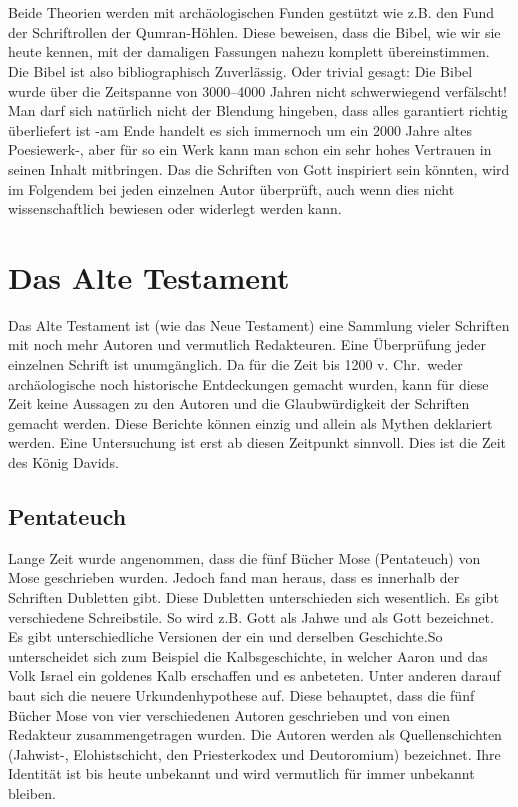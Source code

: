 \\~\\
Beide Theorien werden mit archäologischen Funden gestützt wie z.B. den Fund der Schriftrollen der Qumran-Höhlen. Diese beweisen, dass die Bibel, wie wir sie heute kennen, mit der damaligen Fassungen nahezu komplett übereinstimmen. Die Bibel ist also bibliographisch Zuverlässig. Oder trivial gesagt: Die Bibel wurde über die Zeitspanne von 3000--4000 Jahren nicht schwerwiegend verfälscht! Man darf sich natürlich nicht der Blendung hingeben, dass alles garantiert richtig überliefert ist -am Ende handelt es sich immernoch um ein 2000 Jahre altes Poesiewerk-, aber für so ein Werk kann man schon ein sehr hohes Vertrauen in seinen Inhalt mitbringen. Das die Schriften von Gott inspiriert sein könnten, wird im Folgendem  bei jeden einzelnen Autor überprüft, auch wenn dies nicht wissenschaftlich bewiesen oder widerlegt werden kann. 

\chapter{Das Alte Testament}
Das Alte Testament ist (wie das Neue Testament) eine Sammlung vieler Schriften mit noch mehr Autoren und vermutlich Redakteuren. Eine Überprüfung jeder einzelnen Schrift ist unumgänglich. Da für die Zeit bis 1200 v. Chr.\ weder archäologische noch historische Entdeckungen gemacht wurden, kann für diese Zeit keine Aussagen zu den Autoren und die Glaubwürdigkeit der Schriften gemacht werden. Diese Berichte können einzig und allein als Mythen deklariert werden. Eine Untersuchung ist erst ab diesen Zeitpunkt sinnvoll. Dies ist die Zeit des König Davids.

\section{Pentateuch}
Lange Zeit wurde angenommen, dass die fünf Bücher Mose (Pentateuch) von Mose geschrieben wurden. Jedoch fand man heraus, dass es innerhalb der Schriften Dubletten gibt. Diese Dubletten unterschieden sich wesentlich. Es gibt verschiedene Schreibstile. So wird z.B. Gott als Jahwe und als Gott bezeichnet. Es gibt unterschiedliche Versionen der ein und derselben Geschichte.So unterscheidet sich zum Beispiel die Kalbsgeschichte, in welcher Aaron und das Volk Israel ein goldenes Kalb erschaffen und es anbeteten. Unter anderen darauf baut sich die neuere Urkundenhypothese auf. Diese behauptet, dass die fünf Bücher Mose von vier verschiedenen Autoren geschrieben und von einen Redakteur zusammengetragen wurden. Die Autoren werden als Quellenschichten (Jahwist-, Elohistschicht, den Priesterkodex und Deutoromium)  bezeichnet. Ihre Identität ist bis heute unbekannt und wird vermutlich für immer unbekannt bleiben.

